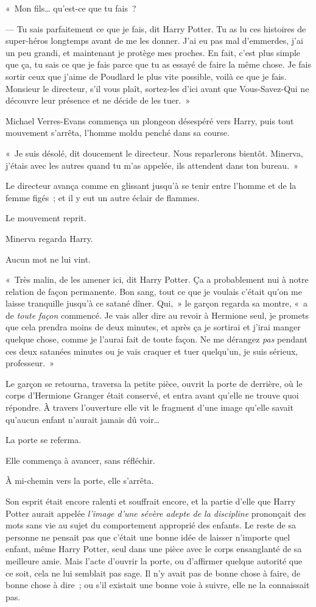 «~Mon fils… qu'est-ce que tu fais~?

--- Tu sais parfaitement ce que je fais, dit Harry Potter. Tu as lu ces histoires de super-héros longtemps avant de me les donner. J'ai eu pas mal d'emmerdes, j'ai un peu grandi, et maintenant je protège mes proches. En fait, c'est plus simple que ça, tu sais ce que je fais parce que tu as essayé de faire la même chose. Je fais sortir ceux que j'aime de Poudlard le plus vite possible, voilà ce que je fais. Monsieur le directeur, s'il vous plaît, sortez-les d'ici avant que Vous-Savez-Qui ne découvre leur présence et ne décide de les tuer.~»

Michael Verres-Evans commença un plongeon désespéré vers Harry, puis tout mouvement s'arrêta, l'homme moldu penché dans sa course.

«~Je suis désolé, dit doucement le directeur. Nous reparlerons bientôt. Minerva, j'étais avec les autres quand tu m'as appelée, ils attendent dans ton bureau.~»

Le directeur avança comme en glissant jusqu'à se tenir entre l'homme et de la femme figés~; et il y eut un autre éclair de flammes.

Le mouvement reprit.

Minerva regarda Harry.

Aucun mot ne lui vint.

«~Très malin, de les amener ici, dit Harry Potter. Ça a probablement nui à notre relation de façon permanente. Bon sang, tout ce que je voulais c'était qu'on me laisse tranquille jusqu'à ce satané dîner. Qui,~» le garçon regarda sa montre, «~a de \emph{toute façon} commencé. Je vais aller dire au revoir à Hermione seul, je promets que cela prendra moins de deux minutes, et après ça je sortirai et j'irai manger quelque chose, comme je l'aurai fait de toute façon. Ne me dérangez \emph{pas} pendant ces deux satanées minutes ou je vais craquer et tuer quelqu'un, je suis sérieux, professeur.~»

Le garçon se retourna, traversa la petite pièce, ouvrit la porte de derrière, où le corps d'Hermione Granger était conservé, et entra avant qu'elle ne trouve quoi répondre. À travers l'ouverture elle vit le fragment d'une image qu'elle savait qu'aucun enfant n'aurait jamais dû voir…

La porte se referma.

Elle commença à avancer, sans réfléchir.

À mi-chemin vers la porte, elle s'arrêta.

Son esprit était encore ralenti et souffrait encore, et la partie d'elle que Harry Potter aurait appelée \emph{l'image d'une sévère adepte de la discipline} prononçait des mots sans vie au sujet du comportement approprié des enfants. Le reste de sa personne ne pensait pas que c'était une bonne idée de laisser n'importe quel enfant, même Harry Potter, seul dans une pièce avec le corps ensanglanté de sa meilleure amie. Mais l'acte d'ouvrir la porte, ou d'affirmer quelque autorité que ce soit, cela ne lui semblait pas sage. Il n'y avait pas de bonne chose à faire, de bonne chose à dire~; ou s'il existait une bonne voie à suivre, elle ne la connaissait pas.

